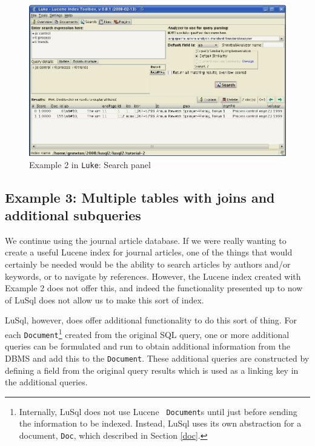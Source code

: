 \begin{figure}
  \begin{center}
    \includegraphics[width=\textwidth]{images/luke_2_3.png}
  \end{center}
  \caption{Example 2 in {\tt Luke}: Search panel}
  \label{luke_2_3}
\end{figure}


\subsection[Example 3]{Example 3: Multiple tables with joins and additional
  subqueries} 
\label{example3}
We continue using the journal article database.
If we were really wanting to create a useful Lucene index for journal
articles, one of the things that would certainly be needed would be the
ability to search articles by authors and/or keywords, or to navigate by
references. 
However, the Lucene index created with Example 2 does not offer this, and
indeed the functionality presented up to now of LuSql does not allow
us to make this sort of index.

LuSql, however, does offer additional functionality to do this sort of thing.
For each {\tt Document}\footnote{Internally, LuSql does not use Lucene {\tt
    Document}s until just before sending the information to be indexed. 
  Instead, LuSql uses its own abstraction for a document, {\tt Doc}, which
  described in Section \ref{doc}.} 
created from the original SQL query, one or more
additional queries can be formulated and run to obtain additional information
from the DBMS and add this to the {\tt Document}. 
These additional queries are constructed by defining a field from the original
query results which is used as a linking key in the additional queries. 

